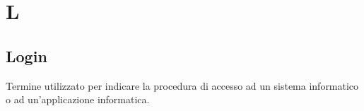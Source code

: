 \section{L}
	\subsection{Login}
		Termine utilizzato per indicare la procedura di accesso ad un sistema informatico o ad un'applicazione informatica.
		
\newpage